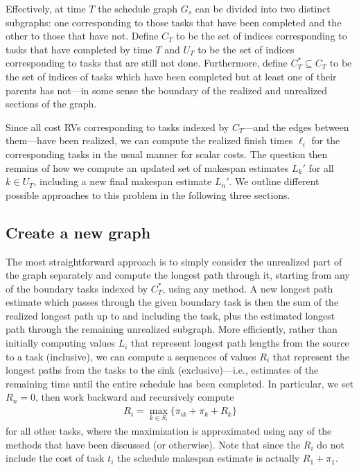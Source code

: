 \documentclass[12pt]{article}
\begin{document}
Effectively, at time $T$ the schedule graph $G_s$ can be divided into two distinct subgraphs: one corresponding to those tasks that have been completed and the other to those that have not. Define $C_T$ to be the set of indices corresponding to tasks that have completed by time $T$ and $U_T$ to be the set of indices corresponding to tasks that are still not done. Furthermore, define $C_T^* \subseteq C_T$ to be the set of indices of tasks which have been completed but at least one of their parents has not---in some sense the boundary of the realized and unrealized sections of the graph.

Since all cost RVs corresponding to tasks indexed by $C_T$---and the edges between them---have been realized, we can compute the realized finish times $\ell_i$ for the corresponding tasks in the usual manner for scalar costs. The question then remains of how we compute an updated set of makespan estimates $L_k'$ for all $k \in U_T$, including a new final makespan estimate $L_n'$. We outline different possible approaches to this problem in the following three sections.

\subsection{Create a new graph}
\label{subsect.remaining}

The most straightforward approach is to simply consider the unrealized part of the graph separately and compute the longest path through it, starting from any of the boundary tasks indexed by $C_T^*$, using any method. A new longest path estimate which passes through the given boundary task is then the sum of the realized longest path up to and including the task, plus the estimated longest path through the remaining unrealized subgraph. More efficiently, rather than initially computing values $L_i$ that represent longest path lengths from the source to a task (inclusive), we can compute a sequences of values $R_i$ that represent the longest paths from the tasks to the sink (exclusive)---i.e., estimates of the remaining time until the entire schedule has been completed. In particular, we set $R_n = 0$, then work backward and recursively compute  
\begin{align*}
  R_i = \max_{k \in S_i} \{ \pi_{ik} + \pi_k + R_k  \}
\end{align*}
for all other tasks, where the maximization is approximated using any of the methods that have been discussed (or otherwise). Note that since the $R_i$ do not include the cost of task $t_i$ the schedule makespan estimate is actually $R_1 + \pi_1$.
\end{document}
